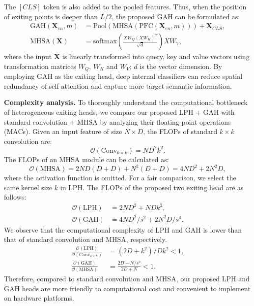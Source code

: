 The $[CLS]$ token is also added to the pooled features. 
Thus, when the position of exiting points is deeper than $L/2$, the proposed GAH can be formulated as:
\begin{equation}
  \begin{aligned}
    \text{GAH}(\mathbf{X}_{en}, m)&=\text{Pool}(\text{MHSA}(\text{PFC}(\mathbf{X}_{en}, m)))+\mathbf{X}_{CLS}, \\
    \text{MHSA}(\mathbf{X})&=\text{softmax}\left(\frac{XW_{Q}(XW_{K})^T}{\sqrt{d}}\right)XW_{V},
  \end{aligned}
\end{equation}
where the input $\mathbf{X}$ is linearly transformed into query, key and value vectors using transformation matrices $W_{Q}$, $W_{K}$ and $W_{V}$; 
$d$ is the vector dimension. 
By employing GAH as the exiting head, deep internal classifiers can reduce spatial redundancy of self-attention and capture more target semantic information. 

\textbf{Complexity analysis.} 
To thoroughly understand the computational bottleneck of heterogeneous exiting heads, 
we compare our proposed LPH + GAH with standard convolution + MHSA by analyzing their floating-point operations (MACs). 
Given an input feature of size $N\times D$, the FLOPs of standard $k\times k$ convolution are:
\begin{equation}
  \mathcal{O} (\text{Conv}_{k\times k})=ND^2k^2. 
\end{equation}
The FLOPs of an MHSA module can be calculated as:
\begin{equation}
  \mathcal{O} (\text{MHSA})=2ND(D+D)+N^2(D+D)=4ND^2+2N^2D, 
\end{equation}
where the activation function is omitted. 
For a fair comparison, we select the same kernel size $k$ in LPH. The FLOPs of the proposed two exiting head are as follows:
\begin{equation}
  \begin{aligned}
    \mathcal{O}(\text{LPH})&=2ND^2+NDk^2, \\
    \mathcal{O}(\text{GAH})&=4ND^2/s^2+2N^2D/s^4.
  \end{aligned}
\end{equation}
We observe that the computational complexity of LPH and GAH is lower than that of standard convolution and MHSA, respectively. 
\begin{equation}
  \begin{aligned}
    \frac{\mathcal{O}(\text{LPH})}{\mathcal{O} (\text{Conv}_{k\times k})}&=(2D+k^2)/Dk^2<1, \\
    \frac{\mathcal{O}(\text{GAH})}{\mathcal{O} (\text{MHSA})}&=\frac{2D+N/s^2}{2D+N}<1.
  \end{aligned}
\end{equation}
Therefore, compared to standard convolution and MHSA, our proposed LPH and GAH heads are more friendly to computational cost and convenient to implement on hardware platforms. 


